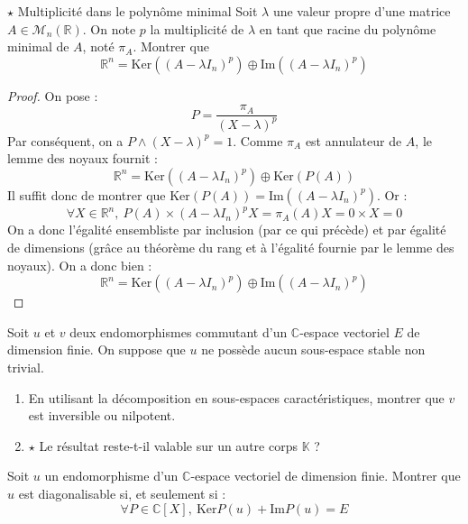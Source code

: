 \documentclass[french,a4paper]{article}
\newcommand{\R}{\mathbb{R}}
\newcommand{\C}{\mathbb{C}}
\newcommand{\K}{\mathbb{K}}
\renewcommand{\ker}{\text{Ker}}
\newcommand{\im}{\text{Im}}
\theoremstyle{plain}
\theoremstyle{definition}
\theoremstyle{remark}
\begin{document}
\begin{ex}{$\star$ Multiplicité dans le polynôme minimal}
	Soit $\lambda$ une valeur propre d'une matrice $A\in\mathcal{M}_n(\R)$. On note $p$ la multiplicité de $\lambda$ en tant que racine du polynôme minimal de $A$, noté $\pi_A$. Montrer que $$\R^n=\ker((A-\lambda I_n)^p)\oplus\im((A-\lambda I_n)^p)$$ 
\end{ex}
\begin{proof}
	On pose : $$P=\frac{\pi_A}{(X-\lambda)^p}$$ Par conséquent, on a $P\wedge(X-\lambda)^p=1$. Comme $\pi_A$ est annulateur de $A$, le lemme des noyaux fournit : $$\R^n=\ker((A-\lambda I_n)^p)\oplus\ker(P(A))$$ Il suffit donc de montrer que $\ker(P(A))=\im((A-\lambda I_n)^p)$. Or : $$\forall X\in\R^n,\ P(A)\times(A-\lambda I_n)^pX=\pi_A(A)X=0\times X=0$$ On a donc l'égalité ensembliste par inclusion (par ce qui précède) et par égalité de dimensions (grâce au théorème du rang et à l'égalité fournie par le lemme des noyaux). On a donc bien :$$\R^n=\ker((A-\lambda I_n)^p)\oplus\im((A-\lambda I_n)^p)$$ 
\end{proof}

\begin{ex}{}
	Soit $u$ et $v$ deux endomorphismes commutant d'un $\C$-espace vectoriel $E$ de dimension finie. On suppose que $u$ ne possède aucun sous-espace stable non trivial.
	\begin{enumerate}
		\item En utilisant la décomposition en sous-espaces caractéristiques, montrer que $v$ est inversible ou nilpotent.
		\item $\star$ Le résultat reste-t-il valable sur un autre corps $\K$ ?
	\end{enumerate}
\end{ex}

\begin{ex}{}
	Soit $u$ un endomorphisme d'un $\C$-espace vectoriel de dimension finie. Montrer que $u$ est diagonalisable si, et seulement si : $$\forall P\in\C[X],\ \ker P(u)+\text{Im}P(u)=E$$
\end{ex}
\end{document}
